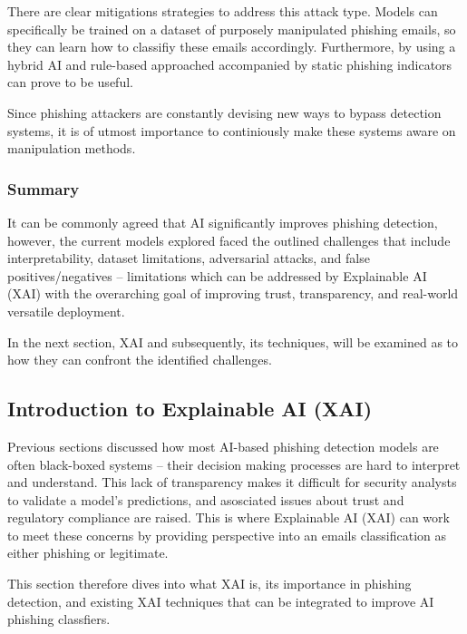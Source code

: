 \noindent There are clear mitigations strategies to address this attack type. Models can specifically be trained on a dataset of purposely manipulated phishing emails, so they can learn how to classifiy these emails accordingly. Furthermore, by using a hybrid AI and rule-based approached accompanied by static phishing indicators can prove to be useful.\newline

\noindent Since phishing attackers are constantly devising new ways to bypass detection systems, it is of utmost importance to continiously make these systems aware on manipulation methods.

\subsubsection*{Summary}
It can be commonly agreed that AI significantly improves phishing detection, however, the current models explored faced the outlined challenges that include interpretability, dataset limitations, adversarial attacks, and false positives/negatives -- limitations which can be addressed by Explainable AI (XAI) with the overarching goal of improving trust, transparency, and real-world versatile deployment.\newline

\noindent In the next section, XAI and subsequently, its techniques, will be examined as to how they can confront the identified challenges.

\newpage

\subsection*{Introduction to Explainable AI (XAI)}
Previous sections discussed how most AI-based phishing detection models are often black-boxed systems -- their decision making processes are hard to interpret and understand. This lack of transparency makes it difficult for security analysts to validate a model's predictions, and asosciated issues about trust and regulatory compliance are raised. This is where Explainable AI (XAI) can work to meet these concerns by providing perspective into an emails classification as either phishing or legitimate.\newline

\noindent This section therefore dives into what XAI is, its importance in phishing detection, and existing XAI techniques that can be integrated to improve AI phishing classfiers.

